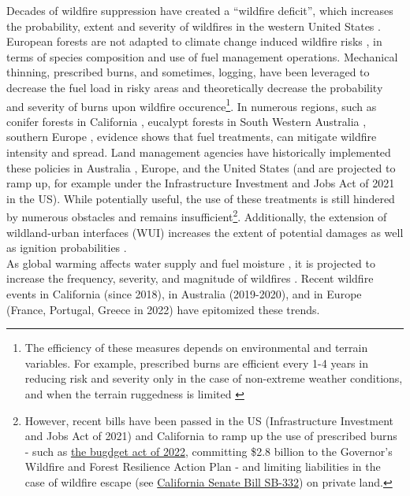Decades of wildfire suppression have created a ``wildfire deficit'', which increases the probability, extent and severity of wildfires in the western United States \citep{kreider_fire_2024}. European forests are not adapted to climate change induced wildfire risks \citep{Khabarov2014ForestFA}, in terms of species composition and use of fuel management operations. Mechanical thinning, prescribed burns, and sometimes, logging, have been leveraged to decrease the fuel load in risky areas and theoretically decrease the probability and severity of burns upon wildfire occurence\footnote{The efficiency of these measures depends on environmental and terrain variables. For example, prescribed burns are efficient every 1-4 years in reducing risk and severity only in the case of non-extreme weather conditions, and when the terrain ruggedness is limited \citep{bradstock_1998}}. In numerous regions, such as conifer forests in California \citep{Vaillant2009, Kalies2016, low_shaded_2023}, eucalypt forests in South Western Australia \citep{burrows2013, boer_long-term_2009, Florec2020}, southern Europe \citep{Fernandes2013}, evidence shows that fuel treatments, can mitigate wildfire intensity and spread. Land management agencies have historically implemented these policies in Australia \citep{burrows2013}, Europe, and the United States (and are projected to ramp up, for example under the Infrastructure Investment and Jobs Act of 2021 in the US). While potentially useful, the use of these treatments is still hindered by numerous obstacles \citep{miller_barriers_2020} and remains insufficient\footnote{ However, recent bills have been passed in the US (Infrastructure Investment and Jobs Act of 2021) and California to ramp up the use of prescribed burns - such as \href{https://wildfiretaskforce.org/about/expenditure-plan/}{the bugdget act of 2022}, committing \$2.8 billion to the Governor’s Wildfire and Forest Resilience Action Plan - and limiting liabilities in the case of wildfire escape (see \href{https://openstates.org/ca/bills/20212022/SB332/}{California Senate Bill SB-332}) on private land.}. 
Additionally, the extension of wildland-urban interfaces (WUI) increases the extent of potential damages as well as ignition probabilities \citep{radeloff_rapid_2018}.
\\
As global warming affects water supply and fuel moisture \citep{jolly_climate-induced_2015, Abatzoglou, ruffault_extreme_2018}, it is projected to increase the frequency, severity, and magnitude of wildfires \citep{Dupuy2019ClimateCI, wasserman_climate_2023}. Recent wildfire events in California (since 2018), in Australia (2019-2020), and in Europe (France, Portugal, Greece in 2022) have epitomized these trends. 
